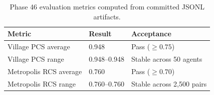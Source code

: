 \begin{table}[h]
\centering
\begin{tabular}{p{2.8in}p{1.0in}p{1.5in}}
\toprule
Metric & Result & Acceptance \\
\midrule
Village PCS average & 0.948 & Pass ($\geq 0.75$) \\
Village PCS range & 0.948--0.948 & Stable across 50 agents \\
Metropolis RCS average & 0.760 & Pass ($\geq 0.70$) \\
Metropolis RCS range & 0.760--0.760 & Stable across 2,500 pairs \\
\bottomrule
\end{tabular}
\caption{Phase 46 evaluation metrics computed from committed JSONL artifacts.}
\end{table}
